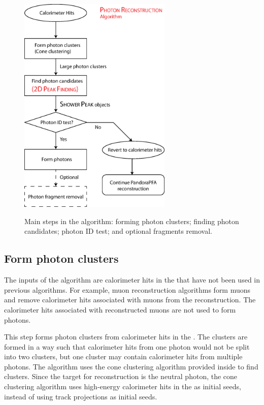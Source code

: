 \begin{figure}[tbph]
\centering
{\includegraphics[width=0.65\textwidth]{photon/photonRecoFlow2}}
\caption[A flow diagram of the \PhotonReconstruction algorithm.]
{Main steps in the \PhotonReconstruction algorithm: forming photon clusters; finding photon candidates; photon ID test; and optional fragments removal.}
\label{fig:photonPhotonRecoFlow}
\end{figure}


\subsection{Form photon clusters}

The inputs of the \PhotonReconstruction algorithm are calorimeter hits in the \ECAL that have not been used in previous algorithms. For example, muon reconstruction algorithms form muons and remove calorimeter hits associated with muons from the reconstruction. The  calorimeter hits associated with reconstructed muons are not used to form photons.

This step forms photon clusters from calorimeter hits in the \ECAL. The clusters are formed in a way such that calorimeter hits from one photon would not be split into two clusters, but one cluster may contain calorimeter hits from  multiple photons. The algorithm uses  the cone clustering algorithm  provided inside \pandora to find clusters.  Since the target for reconstruction is the neutral photon, the cone clustering algorithm uses high-energy calorimeter hits in the \ECAL as initial seeds, instead of using track projections as initial seeds.  %

